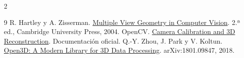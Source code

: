 \documentclass[10pt,a4paper]{article}
\begin{document}
\begin{multicols}{2}
\begin{thebibliography}{9}
\footnotesize
{} R. Hartley y A. Zisserman. \href{https://www.robots.ox.ac.uk/~vgg/hzbook/index.html}{Multiple View Geometry in Computer Vision}. 2.ª ed., Cambridge University Press, 2004.
 OpenCV. \href{https://docs.opencv.org/4.x/d9/d0c/group__calib3d.html}{Camera Calibration and 3D Reconstruction}. Documentación oficial.
 Q.-Y. Zhou, J. Park y V. Koltun. \href{http://www.open3d.org/}{Open3D: A Modern Library for 3D Data Processing}. arXiv:1801.09847, 2018.
\end{thebibliography}

\end{multicols}
\end{document}
